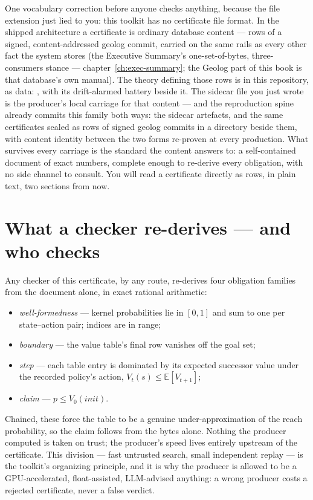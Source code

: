 One vocabulary correction before anyone checks anything, because the
file extension just lied to you: this toolkit has no certificate file
format. In the shipped architecture a certificate is ordinary
database content --- rows of a signed, content-addressed geolog
commit, carried on the same rails as every other fact the system stores
(the Executive Summary's one-set-of-bytes, three-consumers stance
--- chapter~\ref{ch:exec-summary}; the Geolog part of this book is
that database's own manual). The theory defining those rows is in
this repository, as data: , with its
drift-alarmed battery beside it. The
sidecar file you just wrote is the producer's local carriage for that
content --- and the reproduction spine already commits this family
both ways: the sidecar artefacts, and the same certificates sealed as
rows of signed geolog commits in a  directory beside them,
with content identity between the two forms re-proven at every
production. What survives every carriage is the standard the content
answers to: a self-contained document of exact numbers, complete
enough to re-derive every obligation, with no side channel to
consult. You will read a certificate directly as rows, in plain text,
two sections from now.

\section{What a checker re-derives --- and who checks}
\label{sec:qs-check}

Any checker of this certificate, by any route, re-derives four
obligation families from the document alone, in exact rational
arithmetic:

\begin{itemize}
\item \emph{well-formedness} --- kernel probabilities lie in $[0,1]$
  and sum to one per state--action pair; indices are in range;
\item \emph{boundary} --- the value table's final row vanishes off the
  goal set;
\item \emph{step} --- each table entry is dominated by its expected
  successor value under the recorded policy's action,
  $V_t(s) \le \mathbb{E}\!\left[V_{t+1}\right]$;
\item \emph{claim} --- $p \le V_0(\mathit{init})$.
\end{itemize}

\noindent Chained, these force the table to be a genuine
under-approximation of the reach probability, so the claim follows
from the bytes alone. Nothing the producer computed is taken on
trust; the producer's speed lives entirely upstream of the
certificate. This division --- fast untrusted search, small
independent replay --- is the toolkit's organizing principle, and it
is why the producer is allowed to be a GPU-accelerated,
float-assisted, LLM-advised anything: a wrong producer costs a
rejected certificate, never a false verdict.

